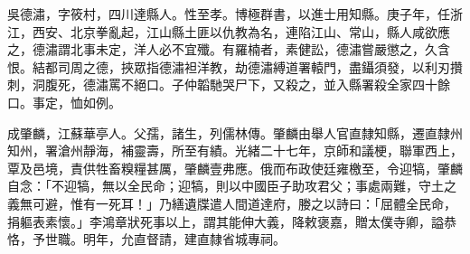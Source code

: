 \begin{pinyinscope}
吳德潚，字筱村，四川達縣人。性至孝。博極群書，以進士用知縣。庚子年，任浙江，西安、北京拳亂起，江山縣土匪以仇教為名，連陷江山、常山，縣人咸欲應之，德潚謂北事未定，洋人必不宜殲。有羅楠者，素健訟，德潚嘗嚴懲之，久含恨。結都司周之德，挾眾指德潚袒洋教，劫德潚縛道署轅門，盡鑷須發，以利刃攢刺，洞腹死，德潚罵不絕口。子仲韜馳哭尸下，又殺之，並入縣署殺全家四十餘口。事定，恤如例。

成肇麟，江蘇華亭人。父孺，諸生，列儒林傳。肇麟由舉人官直隸知縣，遷直隸州知州，署滄州靜海，補靈壽，所至有績。光緒二十七年，京師和議梗，聯軍西上，覃及邑境，責供牲畜糗糧甚厲，肇麟壹弗應。俄而布政使廷雍檄至，令迎犒，肇麟自念：「不迎犒，無以全民命；迎犒，則以中國臣子助攻君父；事處兩難，守土之義無可避，惟有一死耳！」乃繕遺牒遣人間道達府，媵之以詩曰：「屈體全民命，捐軀表素懷。」李鴻章狀死事以上，謂其能伸大義，降敕褒嘉，贈太僕寺卿，謚恭恪，予世職。明年，允直督請，建直隸省城專祠。


\end{pinyinscope}